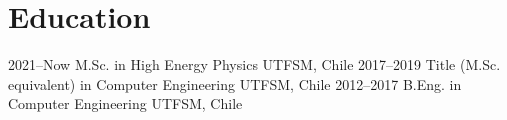 \documentclass[a4paper]{cv-style}
\begin{document}
\section{Education}
    \begin{entrylist}
        \entry
            {2021--Now}
            {M.Sc. {\normalfont in High Energy Physics}}
            {UTFSM, Chile}
            {\vspace{-0.3cm}}
        \entry
            {2017--2019}
            {Title (M.Sc. equivalent) {\normalfont in Computer Engineering}}
            {UTFSM, Chile}
            {\vspace{-0.3cm}}
        \entry
            {2012--2017}
            {B.Eng. {\normalfont in Computer Engineering}}
            {UTFSM, Chile}
            {\vspace{-0.3cm}}
    \end{entrylist}

\pagebreak
\end{document}

